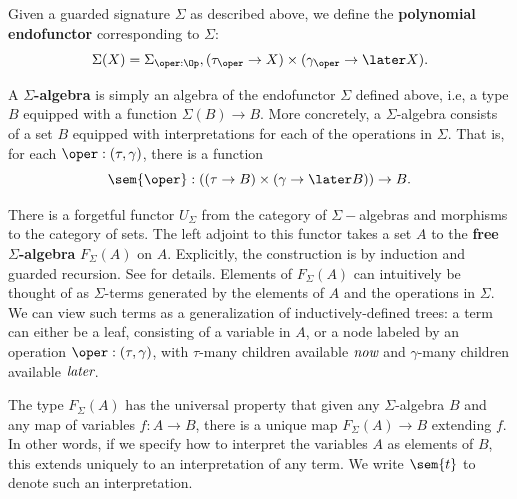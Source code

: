 \documentclass[acmsmall,screen,review,anonymous]{acmart}
\theoremstyle{remark}
\begin{document}
Given a guarded signature $\Sigma$ as described above, we define the
\textbf{polynomial endofunctor} corresponding to $\Sigma$: 
%
\[ \Sigma(X) = \Sigma_{\oper: \Op}, (\tau_\oper \to X) \times (\gamma_\oper \to \later X). \]
%

A \textbf{$\Sigma$-algebra} is simply an algebra of the endofunctor $\Sigma$
defined above, i.e, a type $B$ equipped with a function $\Sigma(B) \to B$. More
concretely, a $\Sigma$-algebra consists of a set $B$ equipped with
interpretations for each of the operations in $\Sigma$. That is, for each $\oper
: (\tau, \gamma)$, there is a function
%
\[ \sem{\oper} : ((\tau \to B) \times (\gamma \to \later B)) \to B. \]
%


There is a forgetful functor $U_\Sigma$ from the category of $\Sigma-$algebras
and morphisms to the category of sets. The left adjoint to this functor takes a
set $A$ to the \textbf{free $\Sigma$-algebra} $F_\Sigma(A)$ on $A$. Explicitly,
the construction is by induction and guarded recursion. See
 for details.
%
Elements of $F_\Sigma(A)$ can intuitively be thought of as $\Sigma$-terms
generated by the elements of $A$ and the operations in $\Sigma$. We can view
such terms as a generalization of inductively-defined trees: a term can either
be a leaf, consisting of a variable in $A$, or a node labeled by an operation
$\oper : (\tau, \gamma)$, with $\tau$-many children available $\emph{now}$ and
$\gamma$-many children available $\emph{later}$.


The type $F_\Sigma(A)$ has the universal property that given any
$\Sigma$-algebra $B$ and any map of variables $f : A \to B$, there is a unique
map $F_\Sigma(A) \to B$ extending $f$. In other words, if we specify how to
interpret the variables $A$ as elements of $B$, this extends uniquely to an
interpretation of any term. We write $\sem{t}$ to denote such an interpretation.
\end{document}
